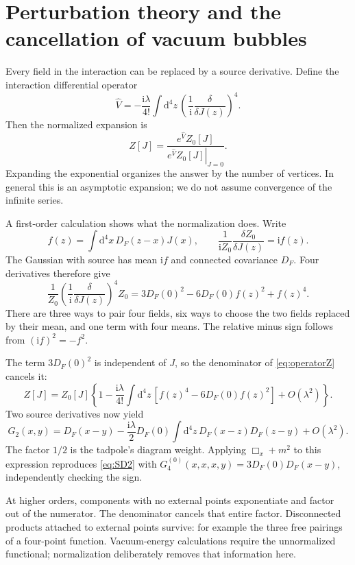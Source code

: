 \documentclass[11pt]{article}
\newcommand{\dd}{\mathrm d}
\newcommand{\ii}{\mathrm i}
\newcommand{\module}[1]{\clearpage\section{#1}}
\begin{document}
\module{Perturbation theory and the cancellation of vacuum bubbles}
Every field in the interaction can be replaced by a source derivative.
Define the interaction differential operator
\[
 \widehat V=-\frac{\ii\lambda}{4!}\int\dd^4z\,
 \left(\frac{1}{\ii}\frac{\delta}{\delta J(z)}\right)^4.
\]
Then the normalized expansion is
\begin{equation}
 Z[J]=\frac{e^{\widehat V}Z_0[J]}
 {\left.e^{\widehat V}Z_0[J]\right|_{J=0}}.         \label{eq:operatorZ}
\end{equation}
Expanding the exponential organizes the answer by the number of
vertices. In general this is an asymptotic expansion; we do not assume
convergence of the infinite series.

A first-order calculation shows what the normalization does. Write
\begin{equation}
 f(z)=\int\dd^4x\,D_F(z-x)J(x),\qquad
 \frac{1}{\ii Z_0}\frac{\delta Z_0}{\delta J(z)}=\ii f(z).
\end{equation}
The Gaussian with source has mean \(\ii f\) and connected covariance
\(D_F\). Four derivatives therefore give
\begin{equation}
 \frac{1}{Z_0}\left(\frac{1}{\ii}\frac{\delta}{\delta J(z)}\right)^4Z_0
 =3D_F(0)^2-6D_F(0)f(z)^2+f(z)^4.                \label{eq:polynomial}
\end{equation}
There are three ways to pair four fields, six ways to choose the two
fields replaced by their mean, and one term with four means. The
relative minus sign follows from \((\ii f)^2=-f^2\).

The term \(3D_F(0)^2\) is independent of \(J\), so the denominator of
\eqref{eq:operatorZ} cancels it:
\begin{equation}
 Z[J]=Z_0[J]\left\{1-\frac{\ii\lambda}{4!}\int\dd^4z\,
 [f(z)^4-6D_F(0)f(z)^2]+O(\lambda^2)\right\}.    \label{eq:Zfirst}
\end{equation}
Two source derivatives now yield
\begin{equation}
 G_2(x,y)=D_F(x-y)-\frac{\ii\lambda}{2}D_F(0)
 \int\dd^4z\,D_F(x-z)D_F(z-y)+O(\lambda^2).
 \label{eq:tadpoleposition}
\end{equation}
The factor \(1/2\) is the tadpole's diagram weight. Applying
\(\Box_x+m^2\) to this expression reproduces \eqref{eq:SD2} with
\(G_4^{(0)}(x,x,x,y)=3D_F(0)D_F(x-y)\), independently checking the sign.

At higher orders, components with no external points exponentiate
and factor out of the numerator. The denominator cancels that entire
factor. Disconnected products attached to external points survive:
for example the three free pairings of a four-point function.
Vacuum-energy calculations require the unnormalized functional;
normalization deliberately removes that information here.
\end{document}
